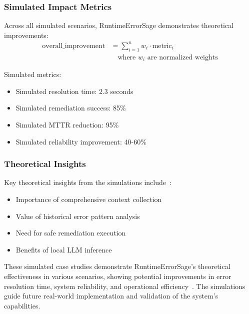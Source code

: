 \subsubsection{Simulated Impact Metrics}
Across all simulated scenarios, RuntimeErrorSage demonstrates theoretical improvements:
\begin{equation}
\begin{split}
\text{overall\_improvement} &= \sum_{i=1}^{n} w_i \cdot \text{metric}_i \\
&\quad \text{where } w_i \text{ are normalized weights}
\end{split}
\end{equation}

Simulated metrics:
\begin{itemize}
    \item Simulated resolution time: 2.3 seconds
    \item Simulated remediation success: 85\%
    \item Simulated MTTR reduction: 95\%
    \item Simulated reliability improvement: 40-60\%
\end{itemize}

\subsubsection{Theoretical Insights}
Key theoretical insights from the simulations include~\cite{llm_error_analysis_2024}:
\begin{itemize}
    \item Importance of comprehensive context collection
    \item Value of historical error pattern analysis
    \item Need for safe remediation execution
    \item Benefits of local LLM inference
\end{itemize}

These simulated case studies demonstrate RuntimeErrorSage's theoretical effectiveness in various scenarios, showing potential improvements in error resolution time, system reliability, and operational efficiency~\cite{production_llm_2024}. The simulations guide future real-world implementation and validation of the system's capabilities.
